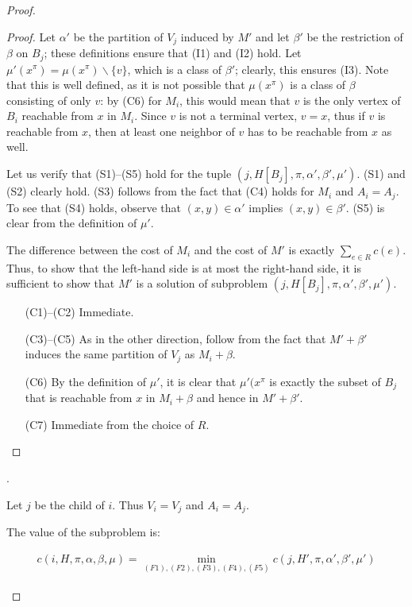\begin{proof}
\begin{proof}
Let \(\alpha'\) be the partition of \(V_j\) induced by \(M'\) and let \(\beta'\) be the restriction of \(\beta\) on \(B_j\); these definitions ensure that (I1) and (I2) hold. Let \(\mu'(x^\pi ) = \mu(x^\pi ) \backslash \{v\}\), which is a class of \(\beta'\); clearly, this ensures (I3). Note that this is well defined, as it is not possible that \(\mu(x^\pi)\) is a class of \(\beta\) consisting of only \(v\): by (C6) for \(M_i\), this would mean that \(v\) is the only vertex of \(B_i\) reachable from \(x\) in \(M_i\). Since \(v\) is not a terminal vertex, \(v = x\), thus if \(v\) is reachable from \(x\), then at least one neighbor of \(v\) has to be reachable from \(x\) as well.

Let us verify that (S1)–(S5) hold for the tuple \((j, H[B_j], \pi, \alpha', \beta', \mu')\). (S1) and (S2) clearly hold. (S3) follows from the fact that (C4) holds for \(M_i\) and \(A_i = A_j\). To see that (S4) holds, observe that \((x, y) \in \alpha'\) implies \((x, y) \in \beta'\). (S5) is clear from the definition of \(\mu'\).

The difference between the cost of \(M_i\) and the cost of \(M'\) is exactly \(\sum_{e \in R} c(e)\). Thus, to show that the left-hand side is at most the right-hand side, it is sufficient to show that \(M'\) is a solution of subproblem \((j, H[B_j], \pi, \alpha', \beta', \mu')\).

\begin{itemize}
    \item[(C1)–(C2)] Immediate.
    \item[(C3)–(C5)] As in the other direction, follow from the fact that \(M' + \beta'\) induces the same partition of \(V_j\) as \(M_i + \beta\).
    \item[(C6)] By the definition of \(\mu'\), it is clear that \(\mu'(x^\pi\) is exactly the subset of \(B_j\) that is reachable from \(x\) in \(M_i + \beta\) and hence in \(M' + \beta'\).
    \item[(C7)] Immediate from the choice of \(R\).
\end{itemize}
\end{proof}

.

\begin{claim}
Let \(j\) be the child of \(i\). Thus \(V_i = V_j\) and \(A_i = A_j\).

The value of the subproblem is:

\begin{align*}
c(i, H, \pi, \alpha, \beta, \mu) = \min_{(F1), (F2), (F3), (F4), (F5)} c(j, H', \pi, \alpha', \beta', \mu')
\end{align*}


\end{claim}
\end{proof}
